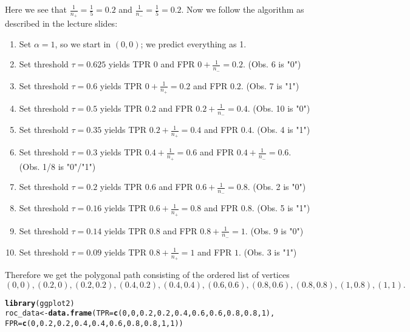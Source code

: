 \documentclass[a4paper]{article}
\makeatletter
\newcommand{\hlnum}[1]{\textcolor[rgb]{0.686,0.059,0.569}{#1}}%
\newcommand{\hlstd}[1]{\textcolor[rgb]{0.345,0.345,0.345}{#1}}%
\newcommand{\hlkwb}[1]{\textcolor[rgb]{0.69,0.353,0.396}{#1}}%
\newcommand{\hlkwc}[1]{\textcolor[rgb]{0.333,0.667,0.333}{#1}}%
\newcommand{\hlkwd}[1]{\textcolor[rgb]{0.737,0.353,0.396}{\textbf{#1}}}%
\newenvironment{kframe}{%
 \def\at@end@of@kframe{}%
 \ifinner\ifhmode%
  \def\at@end@of@kframe{\end{minipage}}%
  \begin{minipage}{\columnwidth}%
 \fi\fi%
 \def\FrameCommand##1{\hskip\@totalleftmargin \hskip-\fboxsep
 \colorbox{shadecolor}{##1}\hskip-\fboxsep
     \hskip-\linewidth \hskip-\@totalleftmargin \hskip\columnwidth}%
 \MakeFramed {\advance\hsize-\width
   \@totalleftmargin\z@ \linewidth\hsize
   \@setminipage}}%
 {\par\unskip\endMakeFramed%
 \at@end@of@kframe}
\newenvironment{knitrout}{}{} %
\makeatother
\begin{document}
{\begin{enumerate}
\begin{knitrout}
\end{knitrout}
Here we see that $\frac{1}{n_+} = \frac{1}{5} = 0.2$ and $\frac{1}{n_-} = \frac{1}{5} = 0.2$. Now we follow the algorithm as described in the lecture slides:
\begin{enumerate}
\item Set $\alpha = 1$, so we start in $(0,0)$; we predict everything as 1.
\item Set threshold $\tau = 0.625$ yields TPR 0 and FPR  $0 + \frac{1}{n_-} = 0.2$. (Obs. 6 is "0")
\item Set threshold $\tau = 0.6$ yields TPR $0 + \frac{1}{n_+} = 0.2$ and FPR  $0.2$. (Obs. 7 is "1")
\item Set threshold $\tau = 0.5$ yields TPR 0.2 and FPR  $0.2 + \frac{1}{n_-} = 0.4$. (Obs. 10 is "0")
\item Set threshold $\tau = 0.35$ yields TPR $0.2 + \frac{1}{n_+} = 0.4$ and FPR  $0.4$. (Obs. 4 is "1")
\item Set threshold $\tau = 0.3$ yields TPR $0.4 + \frac{1}{n_+} = 0.6$ and FPR  $0.4 + \frac{1}{n_-} = 0.6$. (Obs. 1/8 is "0"/"1")
\item Set threshold $\tau = 0.2$ yields TPR $0.6$ and FPR  $0.6 + \frac{1}{n_-} = 0.8$. (Obs. 2 is "0")
\item Set threshold $\tau = 0.16$ yields TPR $0.6 + \frac{1}{n_+} = 0.8$ and FPR  $0.8$. (Obs. 5 is "1")
\item Set threshold $\tau = 0.14$ yields TPR $0.8$ and FPR  $0.8 + \frac{1}{n_-} = 1$. (Obs. 9 is "0")
\item Set threshold $\tau = 0.09$ yields TPR $0.8 + \frac{1}{n_+} = 1$ and FPR  $1$. (Obs. 3 is "1")
\end{enumerate}

Therefore we get the polygonal path consisting of the ordered list of vertices \[(0,0), (0.2,0), (0.2,0.2),
(0.4,0.2), (0.4,0.4), (0.6,0.6), (0.8,0.6), (0.8, 0.8), (1, 0.8), (1,1).\]

\begin{knitrout}
\color{fgcolor}\begin{kframe}
\begin{alltt}
\hlkwd{library}\hlstd{(ggplot2)}
\hlstd{roc_data} \hlkwb{<-} \hlkwd{data.frame}\hlstd{(}\hlkwc{TPR} \hlstd{=} \hlkwd{c}\hlstd{(}\hlnum{0}\hlstd{,} \hlnum{0}\hlstd{,}   \hlnum{0.2}\hlstd{,} \hlnum{0.2}\hlstd{,} \hlnum{0.4}\hlstd{,} \hlnum{0.6}\hlstd{,} \hlnum{0.6}\hlstd{,} \hlnum{0.8}\hlstd{,} \hlnum{0.8}\hlstd{,} \hlnum{1}\hlstd{),}
                       \hlkwc{FPR} \hlstd{=} \hlkwd{c}\hlstd{(}\hlnum{0}\hlstd{,} \hlnum{0.2}\hlstd{,} \hlnum{0.2}\hlstd{,} \hlnum{0.4}\hlstd{,} \hlnum{0.4}\hlstd{,} \hlnum{0.6}\hlstd{,} \hlnum{0.8}\hlstd{,} \hlnum{0.8}\hlstd{,}  \hlnum{1}\hlstd{,}  \hlnum{1}\hlstd{))}


\end{alltt}
\end{kframe}
\end{knitrout}
\end{enumerate}}
\end{document}
